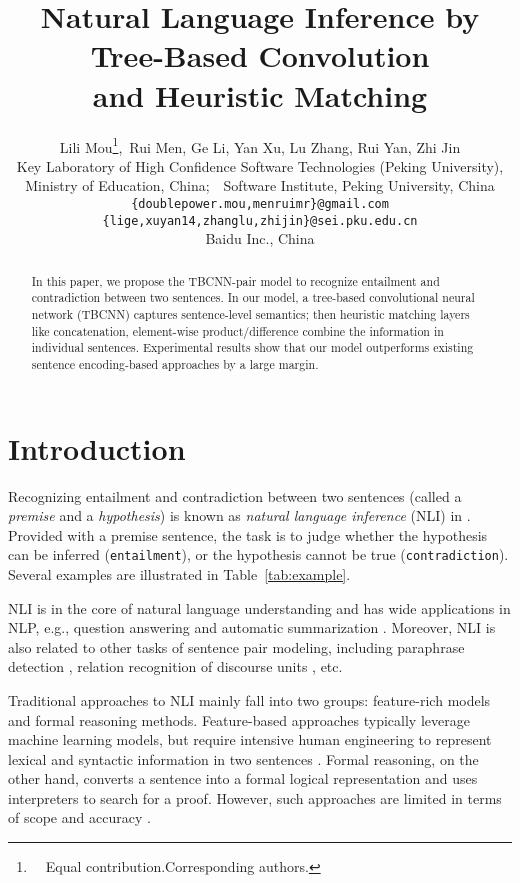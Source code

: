 \documentclass[11pt]{article}
\title{Natural Language Inference by Tree-Based Convolution\\ and Heuristic Matching}
\author{Lili Mou\thanks{\ \ Equal contribution.\quad Corresponding authors.},\, Rui Men,\hspace{-.11cm} Ge Li,\! Yan Xu, Lu Zhang, Rui Yan, Zhi Jin\\
\normalsize Key Laboratory of High Confidence Software Technologies (Peking University),\\\normalsize
Ministry of Education, China;\ \ Software Institute, Peking University, China\\\normalsize
{\tt \{doublepower.mou,menruimr\}@gmail.com}\\ \normalsize
{\tt \{lige,xuyan14,zhanglu,zhijin\}@sei.pku.edu.cn}\\\normalsize
Baidu Inc., China\quad {\tt yanrui02@baidu.com}
}
\date{}
\begin{document}
\renewcommand{\headrulewidth}{0pt}
\thispagestyle{fancy}

\maketitle

\begin{abstract}
In this paper, we propose the TBCNN-pair model to recognize entailment and contradiction between two sentences. In our model, a tree-based convolutional neural network (TBCNN) captures sentence-level semantics; then heuristic matching layers like concatenation, element-wise product/difference combine the information in individual sentences. Experimental results show that our model outperforms existing sentence encoding-based approaches by a large margin.
\end{abstract}


\section{Introduction}

Recognizing entailment and contradiction between two sentences (called a \textit{premise} and a \textit{hypothesis}) is known as \textit{natural language inference} (NLI) in . Provided with a premise sentence, the task is to judge whether the hypothesis can be inferred ({\tt entailment}), or the hypothesis cannot be true ({\tt contradiction}). Several examples are illustrated in Table~\ref{tab:example}.




NLI is in the core of natural language understanding and has wide applications in NLP, e.g., question answering \cite{QA} and automatic summarization \cite{summarization,summarization2,summarization3}. Moreover, NLI is also related to other tasks of sentence pair modeling, including  paraphrase detection \cite{CNN:NIPS}, relation recognition of discourse units \cite{DRR-aaai}, etc.

Traditional approaches to NLI mainly fall into two groups: feature-rich models and formal reasoning methods. Feature-based approaches typically leverage machine learning models, but require intensive human engineering to represent lexical and syntactic information in two sentences \cite{feature1,feature2}. Formal reasoning, on the other hand, converts a sentence into a formal logical representation and uses interpreters to search for a proof. However, such approaches are limited in terms of scope and accuracy \cite{formal}. 
\end{document}
